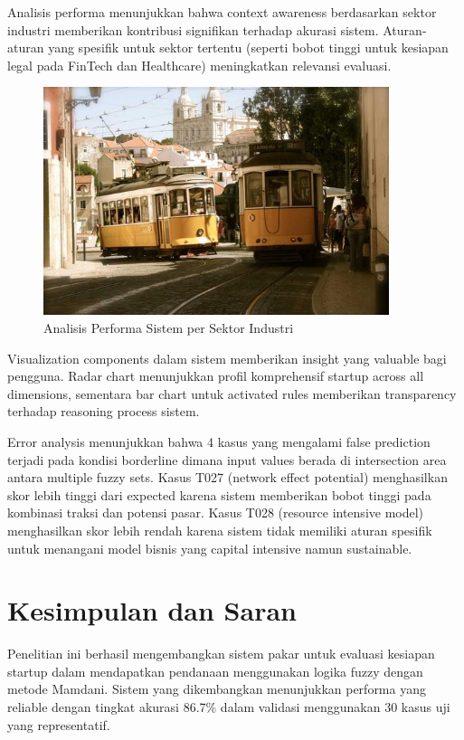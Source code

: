 \documentclass[12pt,a4paper]{article}
\begin{document}
Analisis performa menunjukkan bahwa context awareness berdasarkan sektor industri memberikan kontribusi signifikan terhadap akurasi sistem. Aturan-aturan yang spesifik untuk sektor tertentu (seperti bobot tinggi untuk kesiapan legal pada FinTech dan Healthcare) meningkatkan relevansi evaluasi.

\begin{figure}[H]
    \centering
    \includegraphics[width=0.9\textwidth]{assets/image.png}
    \caption{Analisis Performa Sistem per Sektor Industri}
    \label{fig:sector-analysis}
\end{figure}

Visualization components dalam sistem memberikan insight yang valuable bagi pengguna. Radar chart menunjukkan profil komprehensif startup across all dimensions, sementara bar chart untuk activated rules memberikan transparency terhadap reasoning process sistem.

Error analysis menunjukkan bahwa 4 kasus yang mengalami false prediction terjadi pada kondisi borderline dimana input values berada di intersection area antara multiple fuzzy sets. Kasus T027 (network effect potential) menghasilkan skor lebih tinggi dari expected karena sistem memberikan bobot tinggi pada kombinasi traksi dan potensi pasar. Kasus T028 (resource intensive model) menghasilkan skor lebih rendah karena sistem tidak memiliki aturan spesifik untuk menangani model bisnis yang capital intensive namun sustainable.

\section{Kesimpulan dan Saran}

Penelitian ini berhasil mengembangkan sistem pakar untuk evaluasi kesiapan startup dalam mendapatkan pendanaan menggunakan logika fuzzy dengan metode Mamdani. Sistem yang dikembangkan menunjukkan performa yang reliable dengan tingkat akurasi 86.7\% dalam validasi menggunakan 30 kasus uji yang representatif.
\end{document}
